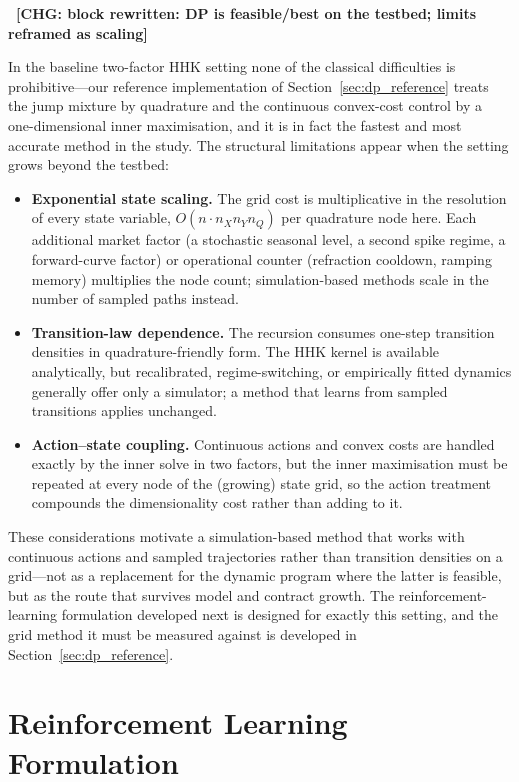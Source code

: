 \documentclass[a4paper,fleqn]{cas-dc}
\newcommand{\hlblock}[1]{\par\noindent
    \colorbox{chgyellow}{\parbox{\dimexpr\linewidth-2\fboxsep\relax}{#1}}\par}
\newcommand{\hlblock}[1]{#1}
\newcommand{\chg}[1]{{\normalfont\bfseries\color{red}~[CHG: \textsf{\footnotesize #1}]~}}
\newcommand{\chg}[1]{}
\begin{document}
\chg{block rewritten: DP is feasible/best on the testbed; limits reframed as scaling}%
\hlblock{In the baseline two-factor HHK setting none of the classical difficulties is prohibitive---our reference implementation of Section~\ref{sec:dp_reference} treats the jump mixture by quadrature and the continuous convex-cost control by a one-dimensional inner maximisation, and it is in fact the fastest and most accurate method in the study. The structural limitations appear when the setting grows beyond the testbed:
\begin{itemize}
    \item \textbf{Exponential state scaling.} The grid cost is multiplicative in the resolution of every state variable, $O(n \cdot n_X n_Y n_Q)$ per quadrature node here. Each additional market factor (a stochastic seasonal level, a second spike regime, a forward-curve factor) or operational counter (refraction cooldown, ramping memory) multiplies the node count; simulation-based methods scale in the number of sampled paths instead.
    \item \textbf{Transition-law dependence.} The recursion consumes one-step transition densities in quadrature-friendly form. The HHK kernel is available analytically, but recalibrated, regime-switching, or empirically fitted dynamics generally offer only a simulator; a method that learns from sampled transitions applies unchanged.
    \item \textbf{Action--state coupling.} Continuous actions and convex costs are handled exactly by the inner solve in two factors, but the inner maximisation must be repeated at every node of the (growing) state grid, so the action treatment compounds the dimensionality cost rather than adding to it.
\end{itemize}
These considerations motivate a simulation-based method that works with continuous actions and sampled trajectories rather than transition densities on a grid---not as a replacement for the dynamic program where the latter is feasible, but as the route that survives model and contract growth. The reinforcement-learning formulation developed next is designed for exactly this setting, and the grid method it must be measured against is developed in Section~\ref{sec:dp_reference}.}

\section{Reinforcement Learning Formulation}
\label{sec:rl_formulation}
\end{document}
